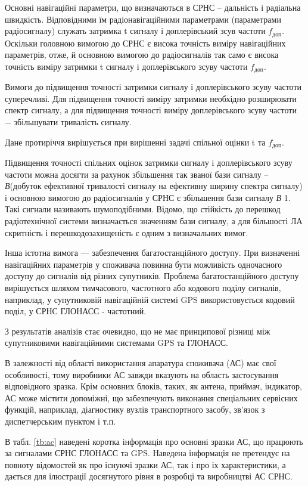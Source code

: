 Основні навігаційні параметри, що визначаються в СРНС -- дальність і радіальна швидкість. Відповідними 
їм радіонавігаційними параметрами (параметрами радіосигналу) служать затримка t сигналу і доплерівський 
зсув частоти $f_\text{доп}$. Оскільки головною вимогою до СРНС є висока точність виміру 
навігаційних параметрів, отже, й основною вимогою до радіосигналів так само є висока точність 
виміру затримки t сигналу і доплерівського зсуву частоти $f_\text{доп}$.

Вимоги до підвищення точності затримки сигналу і доплерівського зсуву частоти суперечливі. 
Для підвищення точності виміру затримки необхідно розширювати спектр сигналу, а для підвищення 
точності виміру  доплерівського зсуву частоти $-$  збільшувати тривалість сигналу.

Дане протиріччя вирішується при вирішенні задачі спільної оцінки t та  $f_\text{доп}$.

Підвищення точності спільних оцінок затримки сигналу і доплерівського зсуву частоти можна 
досягти за рахунок збільшення так званої  бази сигналу -- \textit{В}(добуток ефективної 
тривалості сигналу на ефективну ширину спектра сигналу) і основною вимогою до радіосигналів у 
СРНС є збільшення бази сигналу \textit{В}  1. Такі сигнали називають шумоподібними. 
Відомо, що стійкість до перешкод радіотехнічної системи визначається значенням бази сигналу, 
а для більшості ЛА скритність і перешкодозахищеність є одним з визначальних вимог. 

Інша істотна вимога --- забезпечення багатостанційного доступу. При визначенні навігаційних 
параметрів у споживача повинна бути можливість одночасного доступу до сигналів від різних 
супутників. Проблема багатостанційного доступу вирішується шляхом тимчасового, частотного 
або кодового поділу сигналів, наприклад, у супутниковій навігаційній системі GPS використовується 
кодовий поділ, у СРНС ГЛОНАСС - частотний.

З результатів аналізів стає очевидно, що не має принципової різниці між супутниковими 
навігаційними системами GPS та ГЛОНАСС.

В залежності від області використання апаратура споживача (АС) має свої особливості, 
тому виробники АС завжди вказують на область застосування відповідного зразка. Крім 
основних блоків, таких, як антена, приймач, індикатор, АС може містити допоміжні, що 
забезпечують виконання спеціальних сервісних функцій, наприклад, діагностику вузлів 
транспортного засобу, зв'язок з диспетчерським пунктом і т.п.

В табл. \ref{tb:ac} наведені коротка інформація про основні зразки АС, що працюють за сигналами 
СРНС ГЛОНАСС та GPS. Наведена інформація не претендує на повноту відомостей як про існуючі 
зразки АС, так і про іх характеристики, а дається для ілюстрації досягнутого рівня 
в розробці та виробництві АС СРНС.







